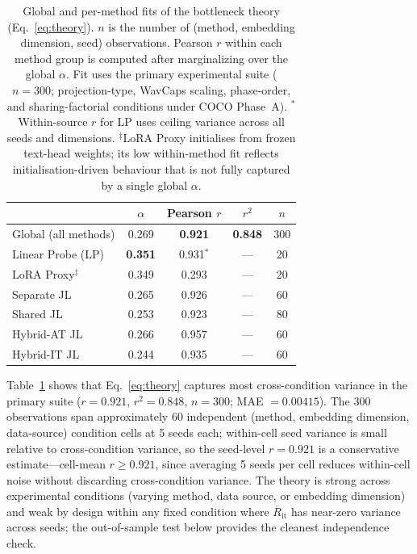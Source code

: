\documentclass{article}
\newcommand{\avgR}{\overline{R}}
\begin{document}
\begin{table}[tbp]
  \caption{Global and per-method fits of the bottleneck theory (Eq.~\ref{eq:theory}).
  $n$ is the number of (method, embedding dimension, seed) observations.
  Pearson $r$ within each method group is computed after marginalizing over the global $\alpha$.
  Fit uses the primary experimental suite ($n=300$; projection-type, WavCaps scaling, phase-order, and sharing-factorial conditions under COCO Phase~A).
  $^\ast$Within-source $r$ for LP uses ceiling variance across all seeds and dimensions.
  $^\ddagger$LoRA Proxy initialises from frozen text-head weights; its low within-method fit reflects
  initialisation-driven behaviour that is not fully captured by a single global $\alpha$.}
  \label{tab:theory}
  \centering
  \footnotesize
  \begin{tabular}{lcccc}
    \toprule
    & $\alpha$ & Pearson $r$ & $r^2$ & $n$ \\
    \midrule
    Global (all methods) & 0.269 & \bf{0.921} & \bf{0.848} & 300 \\
    \midrule
    Linear Probe (LP)    & \bf{0.351} & 0.931$^\ast$ & --- & 20 \\
    LoRA Proxy$^\ddagger$ & 0.349 & 0.293 & --- & 20 \\
    Separate JL          & 0.265 & 0.926 & --- & 60 \\
    Shared JL            & 0.253 & 0.923 & --- & 80 \\
    Hybrid-AT JL         & 0.266 & 0.957 & --- & 60 \\
    Hybrid-IT JL         & 0.244 & 0.935 & --- & 60 \\
    \bottomrule
  \end{tabular}
\end{table}

Table~\ref{tab:theory} shows that Eq.~\ref{eq:theory} captures most cross-condition variance in the primary suite ($r=0.921$, $r^2=0.848$, $n=300$; MAE $=0.00415$).
The 300 observations span approximately 60 independent (method, embedding dimension, data-source) condition cells at 5 seeds each; within-cell seed variance is small relative to cross-condition variance, so the seed-level $r=0.921$ is a conservative estimate---cell-mean $r \geq 0.921$, since averaging 5 seeds per cell reduces within-cell noise without discarding cross-condition variance.
The theory is strong across experimental conditions (varying method, data source, or embedding dimension) and weak by design within any fixed condition where $\avgR_\mathrm{it}$ has near-zero variance across seeds; the out-of-sample test below provides the cleanest independence check.
\end{document}
